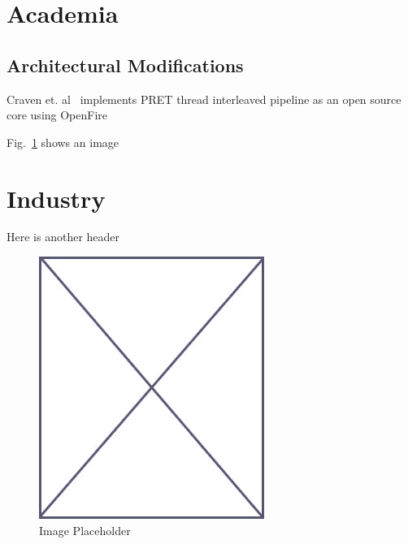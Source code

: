 
\section{Academia}
\subsection{Architectural Modifications}
\label{sec:related_arch_mod}

Craven et. al~\cite{Craven_PRET_implementation_2010} implements PRET thread interleaved pipeline as an open source core using OpenFire 

Fig.~\ref{fig:placeholder_related} shows an image

\section{Industry}

Here is another header

\begin{figure}
\begin{center}
\vspace{-32pt}
\includegraphics[scale=.45]{figs/placeholder}
\end{center}
\vspace{-12pt}
\caption{Image Placeholder}
\label{fig:placeholder_related}
\end{figure}
